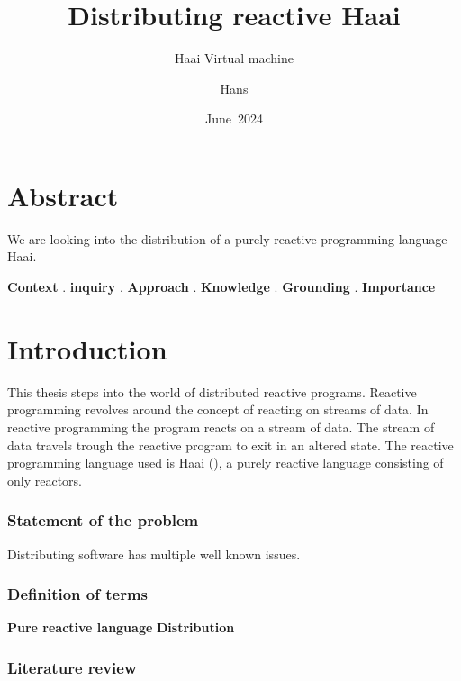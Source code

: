 \documentclass[a4paper]{book}
\title{Distributing reactive Haai}
\subtitle{Haai Virtual machine}
\author{Hans}
\date{June~2024}
\begin{document}
\frontmatter
\maketitle%


\chapter{Abstract}
We are looking into the distribution of a purely reactive programming language Haai. 

\textbf{Context}
.
\textbf{inquiry}
.
\textbf{Approach}
.
\textbf{Knowledge}
.
\textbf{Grounding}
.
\textbf{Importance}



\tableofcontents%

\mainmatter%
\chapter{Introduction}
This thesis steps into the world of distributed reactive programs. Reactive programming revolves around the concept of reacting on streams of data. In reactive programming the program reacts on a stream of data. The stream of data travels trough the reactive program to exit in an altered state. The reactive programming language used is Haai (\cite{oeyen_reactive_2024}), a purely reactive language consisting of only reactors.
\subsection{Statement of the problem}
Distributing software has multiple well known issues. 

\subsection{Definition of terms}
\textbf{Pure reactive language}
\textbf{Distribution}

\subsection{Literature review}
\end{document}
